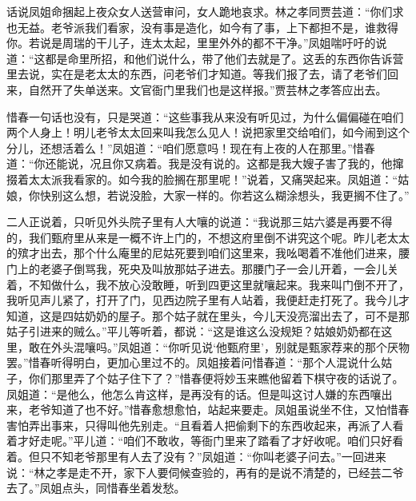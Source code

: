 


\begin{parag}
    话说凤姐命捆起上夜众女人送营审问，女人跪地哀求。林之孝同贾芸道：“你们求也无益。老爷派我们看家，没有事是造化，如今有了事，上下都担不是，谁救得你。若说是周瑞的干儿子，连太太起，里里外外的都不干净。”凤姐喘吁吁的说道：“这都是命里所招，和他们说什么，带了他们去就是了。这丢的东西你告诉营里去说，实在是老太太的东西，问老爷们才知道。等我们报了去，请了老爷们回来，自然开了失单送来。文官衙门里我们也是这样报。”贾芸林之孝答应出去。
\end{parag}


\begin{parag}
    惜春一句话也没有，只是哭道：“这些事我从来没有听见过，为什么偏偏碰在咱们两个人身上！明儿老爷太太回来叫我怎么见人！说把家里交给咱们，如今闹到这个分儿，还想活着么！”凤姐道：“咱们愿意吗！现在有上夜的人在那里。”惜春道：“你还能说，况且你又病着。我是没有说的。这都是我大嫂子害了我的，他撺掇着太太派我看家的。如今我的脸搁在那里呢！”说着，又痛哭起来。凤姐道：“姑娘，你快别这么想，若说没脸，大家一样的。你若这么糊涂想头，我更搁不住了。”
\end{parag}


\begin{parag}
    二人正说着，只听见外头院子里有人大嚷的说道：“我说那三姑六婆是再要不得的，我们甄府里从来是一概不许上门的，不想这府里倒不讲究这个呢。昨儿老太太的殡才出去，那个什么庵里的尼姑死要到咱们这里来，我吆喝着不准他们进来，腰门上的老婆子倒骂我，死央及叫放那姑子进去。那腰门子一会儿开着，一会儿关着，不知做什么，我不放心没敢睡，听到四更这里就嚷起来。我来叫门倒不开了，我听见声儿紧了，打开了门，见西边院子里有人站着，我便赶走打死了。我今儿才知道，这是四姑奶奶的屋子。那个姑子就在里头，今儿天没亮溜出去了，可不是那姑子引进来的贼么。”平儿等听着，都说：“这是谁这么没规矩？姑娘奶奶都在这里，敢在外头混嚷吗。”凤姐道：“你听见说‘他甄府里’，别就是甄家荐来的那个厌物罢。”惜春听得明白，更加心里过不的。凤姐接着问惜春道：“那个人混说什么姑子，你们那里弄了个姑子住下了？”惜春便将妙玉来瞧他留着下棋守夜的话说了。凤姐道：“是他么，他怎么肯这样，是再没有的话。但是叫这讨人嫌的东西嚷出来，老爷知道了也不好。”惜春愈想愈怕，站起来要走。凤姐虽说坐不住，又怕惜春害怕弄出事来，只得叫他先别走。“且看着人把偷剩下的东西收起来，再派了人看着才好走呢。”平儿道：“咱们不敢收，等衙门里来了踏看了才好收呢。咱们只好看着。但只不知老爷那里有人去了没有？”凤姐道：“你叫老婆子问去。”一回进来说：“林之孝是走不开，家下人要伺候查验的，再有的是说不清楚的，已经芸二爷去了。”凤姐点头，同惜春坐着发愁。
\end{parag}


